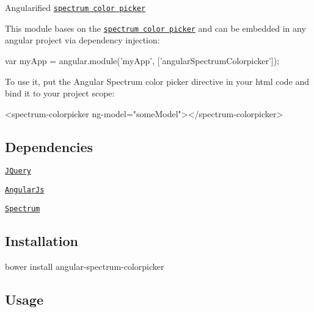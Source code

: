 \href{https://travis-ci.org/Jimdo/angular-spectrum-colorpicker}{\tt } \href{https://coveralls.io/r/Jimdo/angular-spectrum-colorpicker?branch=master}{\tt } \href{https://david-dm.org/Jimdo/angular-spectrum-colorpicker#info=devDependencies}{\tt }

Angularified \href{http://bgrins.github.io/spectrum/}{\tt spectrum color picker}

This module bases on the \href{http://bgrins.github.io/spectrum/}{\tt spectrum color picker} and can be embedded in any angular project via dependency injection\+:


\begin{DoxyCode}
var myApp = angular.module('myApp', ['angularSpectrumColorpicker']);
\end{DoxyCode}


To use it, put the Angular Spectrum color picker directive in your html code and bind it to your project scope\+:


\begin{DoxyCode}
<spectrum-colorpicker ng-model="someModel"></spectrum-colorpicker>
\end{DoxyCode}


\subsection*{Dependencies }


\begin{DoxyItemize}
\item \href{http://jquery.com/}{\tt J\+Query}
\item \href{http://angularjs.org/}{\tt Angular\+Js}
\item \href{http://bgrins.github.io/spectrum/}{\tt Spectrum}
\end{DoxyItemize}

\subsection*{Installation }


\begin{DoxyCode}
bower install angular-spectrum-colorpicker
\end{DoxyCode}


\subsection*{Usage }


